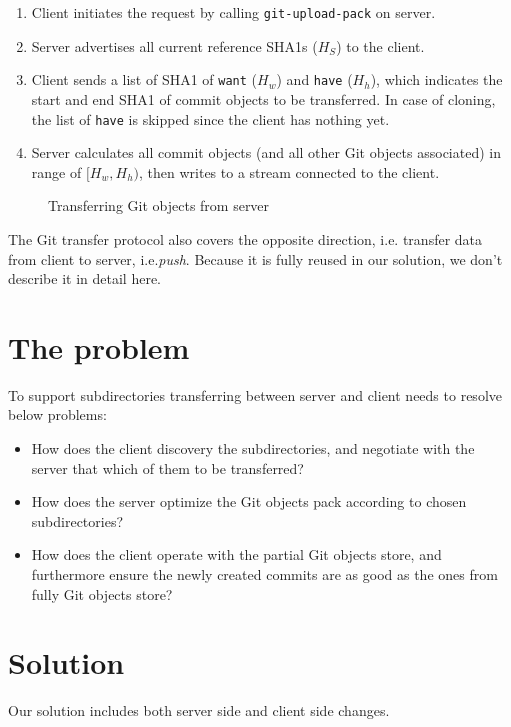 \documentclass[preprint]{sigplanconf}
\begin{document}
\begin{enumerate}
  \item Client initiates the request by calling \verb|git-upload-pack| on
    server.
  \item Server advertises all current reference SHA1s ($H_S$) to the client.
  \item Client sends a list of SHA1 of \verb|want| ($H_w$) and \verb|have|
    ($H_h$), which indicates the start and end SHA1 of commit objects to be
    transferred.
    In case of cloning, the list of \verb|have| is skipped since the client has
    nothing yet.
  \item Server calculates all commit objects (and all other Git objects
    associated) in range of $[H_w, H_h)$, then writes to a stream connected to
    the client.
\end{enumerate}

\begin{figure}[htpb]
  \centering
  
  \caption{Transferring Git objects from server}
  \label{fig:git-proto-clone-seq}
\end{figure}
The Git transfer protocol also covers the opposite direction, i.e. transfer
data from client to server, i.e.\emph{push}.
Because it is fully reused in our solution, we don't describe it in detail
here.

\section{The problem}
To support subdirectories transferring between server and client needs to
resolve below problems:
\begin{itemize}
  \item How does the client discovery the subdirectories, and negotiate with
      the server that which of them to be transferred?
  \item How does the server optimize the Git objects pack according to chosen
      subdirectories?
  \item How does the client operate with the partial Git objects store, and
      furthermore ensure the newly created commits are as good as the ones
      from fully Git objects store?
\end{itemize}

\section{Solution}
Our solution includes both server side and client side changes.
\end{document}

